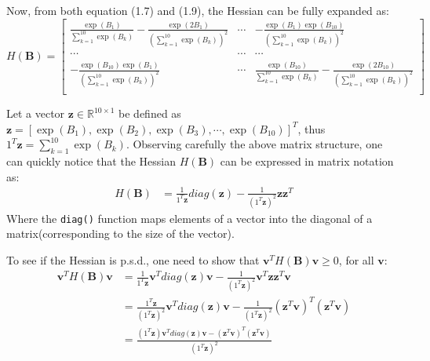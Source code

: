 \documentclass[12pt]{article}
\numberwithin{equation}{section}
\theoremstyle{remark}
\newcommand{\R}{\mathbb R} %
\newcommand{\vect}[1]{\boldsymbol{#1}}
\begin{document}
\medskip
Now, from both equation (1.7) and (1.9), the Hessian can be fully expanded as:
$$ H(\vect{B}) = 
\begin{bmatrix} 
\frac{\exp \left( B_{1} \right)}{\sum\limits_{k = 1}^{10} \exp \left( B_{k} \right)} - \frac{\exp \left( 2B_{1} \right)}{\left(\sum\limits_{k = 1}^{10} \exp \left( B_{k} \right)\right)^2}& \cdots & -\frac{\exp \left( B_{1} \right)\exp \left( B_{10} \right)}{\left(\sum\limits_{k = 1}^{10} \exp \left( B_{k} \right)\right)^2} \\
\cdots & \cdots & \cdots\\
-\frac{\exp \left( B_{10} \right)\exp \left( B_{1} \right)}{\left(\sum\limits_{k = 1}^{10} \exp \left( B_{k} \right)\right)^2} & \cdots & \frac{\exp \left( B_{10} \right)}{\sum\limits_{k = 1}^{10} \exp \left( B_{k} \right)} - \frac{\exp \left( 2B_{10} \right)}{\left(\sum\limits_{k = 1}^{10} \exp \left( B_{k} \right)\right)^2} \\
\end{bmatrix}
\quad
$$

\medskip
Let a vector $\vect{z} \in \R^{10 \times 1}$ be defined as $\vect{z} = \left[\exp(B_{1}), \exp(B_{2}), \exp(B_{3}), \cdots, \exp(B_{10})\right]^{T}$, thus $1^{T}\vect{z} = \sum\limits_{k = 1}^{10} \exp \left( B_{k} \right)$. Observing carefully the above matrix structure, one can quickly notice that the Hessian $ H(\vect{B})$ can be expressed in matrix notation as:
\begin{align}
H(\vect{B}) &= \frac{1}{1^{T}\vect{z}}diag(\vect{z}) - \frac{1}{\left(1^{T}\vect{z}\right)^2}\vect{z}\vect{z}^{T}
\end{align}
Where the \texttt{diag()} function maps elements of a vector into the diagonal of a matrix(corresponding to the size of the vector). 

\medskip
To see if the Hessian is p.s.d., one need to show that $\vect{v}^{T}H(\vect{B})\vect{v} \geq 0$, for all $\vect{v}$:
\begin{align}
\vect{v}^{T}H(\vect{B})\vect{v} &= \frac{1}{1^{T}\vect{z}}\vect{v}^{T}diag(\vect{z})\vect{v} - \frac{1}{\left(1^{T}\vect{z}\right)^2}\vect{v}^{T}\vect{z}\vect{z}^{T}\vect{v} \\
&= \frac{1^{T}\vect{z}}{\left(1^{T}\vect{z}\right)^2}\vect{v}^{T}diag(\vect{z})\vect{v} - \frac{1}{\left(1^{T}\vect{z}\right)^2}\left(\vect{z}^{T}\vect{v}\right)^{T}\left(\vect{z}^{T}\vect{v}\right) \\
&= \frac{\left(1^{T}\vect{z}\right)\vect{v}^{T}diag(\vect{z})\vect{v} - \left(\vect{z}^{T}\vect{v}\right)^{T}\left(\vect{z}^{T}\vect{v}\right)}{\left(1^{T}\vect{z}\right)^2}
\end{align}
\end{document}
